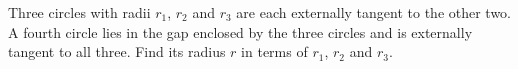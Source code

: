 Three circles with radii $r_1$, $r_2$ and $r_3$ are each externally tangent to the other two. A fourth circle lies in the gap enclosed by the three circles and is externally tangent to all three. Find its radius $r$ in terms of $r_1$, $r_2$ and $r_3$.
